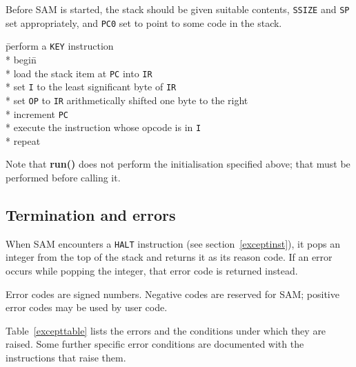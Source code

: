 \documentclass[english]{scrartcl}
\begin{document}
Before SAM is started, the stack should be given suitable contents, {\tt SSIZE} and {\tt SP} set appropriately, and {\tt PC0} set to point to some code in the stack.

\begin{tabbing}
  \hspace{0.5in}\=perform a {\tt KEY} instruction\+ \\*
  begin\=\+ \\*
  load the stack item at {\tt PC} into {\tt IR} \\*
  set {\tt I} to the least significant byte of {\tt IR} \\*
  set {\tt OP} to {\tt IR} arithmetically shifted one byte to the right \\*
  increment {\tt PC} \\*
  execute the instruction whose opcode is in {\tt I} \- \\*
  repeat
\end{tabbing}

Note that \textbf{run()} does not perform the initialisation specified above; that must be performed before calling it.


\subsection{Termination and errors}

When SAM encounters a {\tt HALT} instruction (see section~\ref{exceptinst}),
it pops an integer from the top of the stack and returns it as its reason code. If an error occurs while popping the integer, that error code is returned instead.

Error codes are signed numbers. Negative codes are reserved for SAM; positive error codes may be used by user code.

Table~\ref{excepttable} lists the errors and the conditions under which they are raised. Some further specific error conditions are documented with the instructions that raise them.
\end{document}
